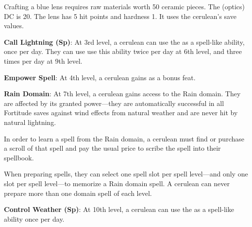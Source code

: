 {Crafting a blue lens requires raw materials worth 50 ceramic pieces. The  (optics) DC is 20. The lens has 5 hit points and hardness 1. It uses the cerulean's save values.

\textbf{Call Lightning (Sp)}: At 3rd level, a cerulean can use the  as a spell-like ability, once per day. They can use use this ability twice per day at 6th level, and three times per day at 9th level.

\textbf{Empower Spell}: At 4th level, a cerulean gains  as a bonus feat.

\textbf{Rain Domain}: At 7th level, a cerulean gains access to the Rain domain. They are affected by its granted power---they are automatically successful in all Fortitude saves against wind effects from natural weather and are never hit by natural lightning.

In order to learn a spell from the Rain domain, a cerulean must find or purchase a scroll of that spell and pay the usual price to scribe the spell into their spellbook. 

When preparing spells, they can select one spell slot per spell level---and only one slot per spell level---to memorize a Rain domain spell. A cerulean can never prepare more than one domain spell of each level.

\textbf{Control Weather (Sp)}: At 10th level, a cerulean can use the  as a spell-like ability once per day.
}

